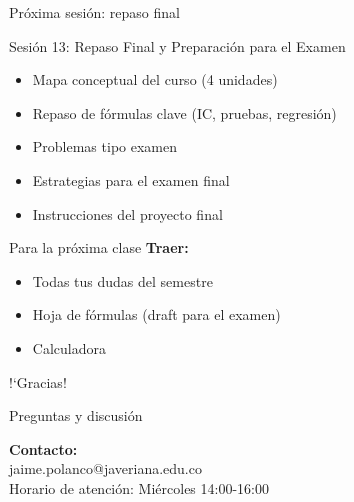 \documentclass[aspectratio=169, 11pt]{beamer}
\begin{document}
\begin{frame}{Próxima sesión: repaso final}
\begin{block}{Sesión 13: Repaso Final y Preparación para el Examen}
\begin{itemize}
\item Mapa conceptual del curso (4 unidades)
\item Repaso de fórmulas clave (IC, pruebas, regresión)
\item Problemas tipo examen
\item Estrategias para el examen final
\item Instrucciones del proyecto final
\end{itemize}
\end{block}

\vspace{0.1cm}
\begin{alertblock}{Para la pr\'oxima clase}
\textbf{Traer:}
\begin{itemize}
\item Todas tus dudas del semestre
\item Hoja de f\'ormulas (draft para el examen)
\item Calculadora
\end{itemize}
\end{alertblock}
\end{frame}

\begin{frame}{}
\begin{center}
\Huge !`Gracias!

\vspace{0.8cm}
\Large Preguntas y discusi\'on

\vspace{1.2cm}
\normalsize
\textbf{Contacto:}\\
jaime.polanco@javeriana.edu.co\\
Horario de atención: Miércoles 14:00-16:00
\end{center}
\end{frame}
\end{document}

